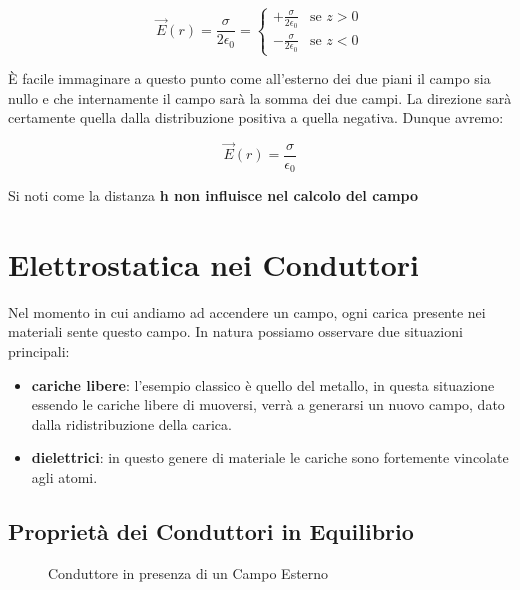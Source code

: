 \begin{equation} \label{eq_campo_piano_indefinito}
	\vec{E}(r) = \frac{\sigma}{2\epsilon_0} = \begin{cases}
		+ \frac{\sigma}{2\epsilon_0}  &  \text{se } z > 0 \\
		- \frac{\sigma}{2\epsilon_0} & \text{se } z < 0
	\end{cases}
\end{equation}

È facile immaginare a questo punto come all'esterno dei due piani il campo sia nullo e che internamente il campo sarà la somma dei due campi. La direzione sarà certamente quella dalla distribuzione positiva a quella negativa. Dunque avremo: 

\begin{equation} \label{eq_campo_condensatore}
	\vec{E}(r) = \frac{\sigma}{\epsilon_0}
\end{equation}

Si noti come la distanza \textbf{h non influisce nel calcolo del campo}

\section{Elettrostatica nei Conduttori}

Nel momento in cui andiamo ad accendere un campo, ogni carica presente nei materiali sente questo campo. In natura possiamo osservare due situazioni principali: 

\begin{itemize}
	\item \textbf{cariche libere}: l'esempio classico è quello del metallo, in questa situazione essendo le cariche libere di muoversi, verrà a generarsi un nuovo campo, dato dalla ridistribuzione della carica. 
	\item \textbf{dielettrici}: in questo genere di materiale le cariche sono fortemente vincolate agli atomi.
\end{itemize}

\subsection{Proprietà dei Conduttori in Equilibrio}

\begin{figure} [ht]\label{fig_conduttore}
	\centering
\caption{Conduttore in presenza di un Campo Esterno}
\end{figure}

